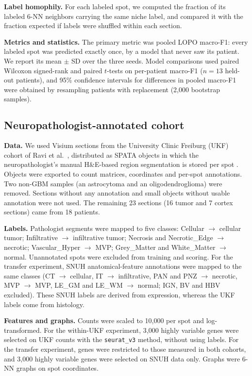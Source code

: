 \documentclass[11pt,letterpaper]{article}
\begin{document}
\textbf{Label homophily.} For each labeled spot, we computed the fraction of its labeled 6-NN neighbors carrying the same niche label, and compared it with the fraction expected if labels were shuffled within each section.

\textbf{Metrics and statistics.} The primary metric was pooled LOPO macro-F1: every labeled spot was predicted exactly once, by a model that never saw its patient. We report its mean $\pm$ SD over the three seeds. Model comparisons used paired Wilcoxon signed-rank and paired $t$-tests on per-patient macro-F1 ($n = 13$ held-out patients), and 95\% confidence intervals for differences in pooled macro-F1 were obtained by resampling patients with replacement (2{,}000 bootstrap samples).

\subsection{Neuropathologist-annotated cohort}

\textbf{Data.} We used Visium sections from the University Clinic Freiburg (UKF) cohort of Ravi et al.\ \cite{ravi2022}, distributed as SPATA objects in which the neuropathologist's manual H\&E-based region segmentation is stored per spot \cite{ritter2025}. Objects were exported to count matrices, coordinates and per-spot annotations. Two non-GBM samples (an astrocytoma and an oligodendroglioma) were removed. Sections without any annotation and small objects without usable annotation were not used. The remaining 23 sections (16 tumor and 7 cortex sections) came from 18 patients.

\textbf{Labels.} Pathologist segments were mapped to five classes: Cellular $\rightarrow$ cellular tumor; Infiltrative $\rightarrow$ infiltrative tumor; Necrosis and Necrotic\_Edge $\rightarrow$ necrotic; Vascular\_Hyper $\rightarrow$ MVP; Grey\_Matter and White\_Matter $\rightarrow$ normal. Unannotated spots were excluded from training and scoring. For the transfer experiment, SNUH anatomical-feature annotations were mapped to the same classes (CT $\rightarrow$ cellular, IT $\rightarrow$ infiltrative, PAN and PNZ $\rightarrow$ necrotic, MVP $\rightarrow$ MVP, LE\_GM and LE\_WM $\rightarrow$ normal; IGN, BV and HBV excluded). These SNUH labels are derived from expression, whereas the UKF labels come from histology.

\textbf{Features and graphs.} Counts were scaled to 10{,}000 per spot and log-transformed. For the within-UKF experiment, 3{,}000 highly variable genes were selected on UKF counts with the \texttt{seurat\_v3} method, without using labels. For the transfer experiment, genes were restricted to those measured in both cohorts, and 3{,}000 highly variable genes were selected on SNUH data only. Graphs were 6-NN graphs on spot coordinates.
\end{document}
